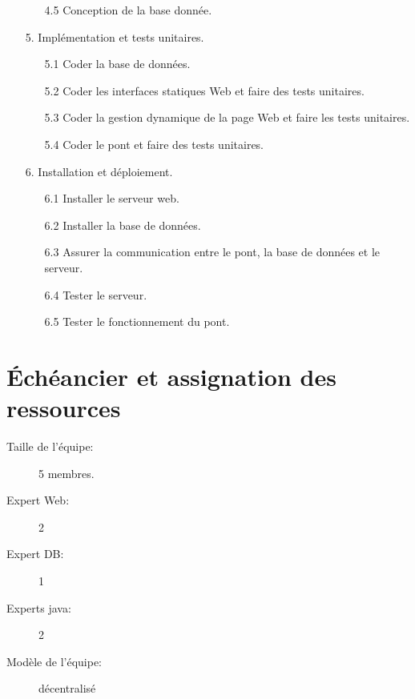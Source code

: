 \documentclass[10pt,a4paper]{report}
\begin{document}
\begin{enumerate}
\begin{enumerate}
\item[4.5] Conception de la base donnée.\\
\end{enumerate}
\item[5.] Implémentation et tests unitaires.\\
\begin{enumerate}
\item[5.1] Coder la base de données.\\
\item[5.2] Coder les interfaces statiques Web et faire des tests unitaires.\\
\item[5.3] Coder la gestion dynamique de la page Web et faire les tests unitaires.\\
\item[5.4] Coder le pont et faire des tests unitaires.\\
\end{enumerate}
\item[6.] Installation et déploiement.\\
\begin{enumerate}
\item[6.1] Installer le serveur web.\\
\item[6.2] Installer la base de données.\\
\item[6.3] Assurer la communication entre le pont, la base de données et le serveur.\\
\item[6.4] Tester le serveur.\\
\item[6.5] Tester le fonctionnement du pont.\\
\end{enumerate}
\end{enumerate}
\section*{Échéancier et assignation des ressources}
\begin{description}
\item[Taille de l'équipe:] 5 membres.
\item[Expert Web:] 2
\item[Expert DB:] 1
\item[Experts java:] 2
\item[Modèle de l'équipe:] décentralisé
\end{description}
\end{document}
